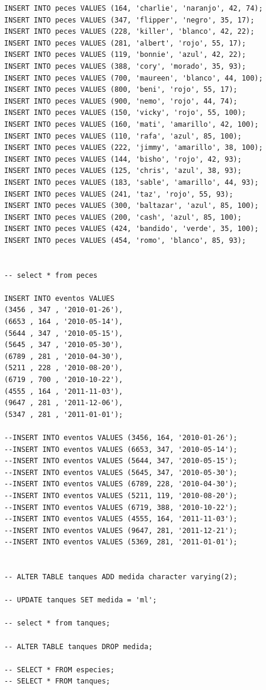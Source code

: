 \begin{lstlisting}[label=codigo1, caption=Ejemplo de SQL]
INSERT INTO peces VALUES (164, 'charlie', 'naranjo', 42, 74);
INSERT INTO peces VALUES (347, 'flipper', 'negro', 35, 17);
INSERT INTO peces VALUES (228, 'killer', 'blanco', 42, 22);
INSERT INTO peces VALUES (281, 'albert', 'rojo', 55, 17);
INSERT INTO peces VALUES (119, 'bonnie', 'azul', 42, 22);
INSERT INTO peces VALUES (388, 'cory', 'morado', 35, 93);
INSERT INTO peces VALUES (700, 'maureen', 'blanco', 44, 100);
INSERT INTO peces VALUES (800, 'beni', 'rojo', 55, 17);
INSERT INTO peces VALUES (900, 'nemo', 'rojo', 44, 74);
INSERT INTO peces VALUES (150, 'vicky', 'rojo', 55, 100);
INSERT INTO peces VALUES (160, 'mati', 'amarillo', 42, 100);
INSERT INTO peces VALUES (110, 'rafa', 'azul', 85, 100);
INSERT INTO peces VALUES (222, 'jimmy', 'amarillo', 38, 100);
INSERT INTO peces VALUES (144, 'bisho', 'rojo', 42, 93);
INSERT INTO peces VALUES (125, 'chris', 'azul', 38, 93);
INSERT INTO peces VALUES (183, 'sable', 'amarillo', 44, 93);
INSERT INTO peces VALUES (241, 'taz', 'rojo', 55, 93);
INSERT INTO peces VALUES (300, 'baltazar', 'azul', 85, 100);
INSERT INTO peces VALUES (200, 'cash', 'azul', 85, 100);
INSERT INTO peces VALUES (424, 'bandido', 'verde', 35, 100);
INSERT INTO peces VALUES (454, 'romo', 'blanco', 85, 93);


-- select * from peces

INSERT INTO eventos VALUES 
(3456 , 347 , '2010-01-26'),
(6653 , 164 , '2010-05-14'),
(5644 , 347 , '2010-05-15'),
(5645 , 347 , '2010-05-30'),
(6789 , 281 , '2010-04-30'),
(5211 , 228 , '2010-08-20'),
(6719 , 700 , '2010-10-22'),
(4555 , 164 , '2011-11-03'),
(9647 , 281 , '2011-12-06'),
(5347 , 281 , '2011-01-01');

--INSERT INTO eventos VALUES (3456, 164, '2010-01-26'); 
--INSERT INTO eventos VALUES (6653, 347, '2010-05-14'); 
--INSERT INTO eventos VALUES (5644, 347, '2010-05-15'); 
--INSERT INTO eventos VALUES (5645, 347, '2010-05-30'); 
--INSERT INTO eventos VALUES (6789, 228, '2010-04-30'); 
--INSERT INTO eventos VALUES (5211, 119, '2010-08-20'); 
--INSERT INTO eventos VALUES (6719, 388, '2010-10-22'); 
--INSERT INTO eventos VALUES (4555, 164, '2011-11-03'); 
--INSERT INTO eventos VALUES (9647, 281, '2011-12-21'); 
--INSERT INTO eventos VALUES (5369, 281, '2011-01-01'); 


-- ALTER TABLE tanques ADD medida character varying(2); 

-- UPDATE tanques SET medida = 'ml';

-- select * from tanques;

-- ALTER TABLE tanques DROP medida;

-- SELECT * FROM especies;
-- SELECT * FROM tanques;
\end{lstlisting}\vspace{-0.3cm}




